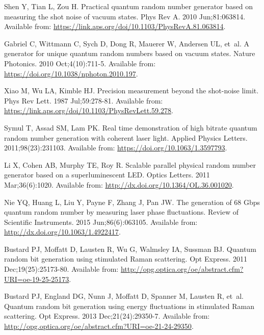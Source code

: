\documentclass[]{interact}
\theoremstyle{plain}%
\theoremstyle{definition}
\theoremstyle{remark}
\begin{document}
\begin{thebibliography}{100}
Shen Y, Tian L, Zou H.
\newblock Practical quantum random number generator based on measuring the shot
  noise of vacuum states.
\newblock Phys Rev A. 2010 Jun;81:063814.
\newblock Available from:
  \url{https://link.aps.org/doi/10.1103/PhysRevA.81.063814}.

Gabriel C, Wittmann C, Sych D, Dong R, Mauerer W, Andersen UL, et~al.
\newblock A generator for unique quantum random numbers based on vacuum states.
\newblock Nature Photonics. 2010 Oct;4(10):711-5.
\newblock Available from: \url{https://doi.org/10.1038/nphoton.2010.197}.

Xiao M, Wu LA, Kimble HJ.
\newblock Precision measurement beyond the shot-noise limit.
\newblock Phys Rev Lett. 1987 Jul;59:278-81.
\newblock Available from:
  \url{https://link.aps.org/doi/10.1103/PhysRevLett.59.278}.

Symul T, Assad SM, Lam PK.
\newblock Real time demonstration of high bitrate quantum random number
  generation with coherent laser light.
\newblock Applied Physics Letters. 2011;98(23):231103.
\newblock Available from: \url{https://doi.org/10.1063/1.3597793}.

Li X, Cohen AB, Murphy TE, Roy R.
\newblock Scalable parallel physical random number generator based on a
  superluminescent LED.
\newblock Optics Letters. 2011 Mar;36(6):1020.
\newblock Available from: \url{http://dx.doi.org/10.1364/OL.36.001020}.

Nie YQ, Huang L, Liu Y, Payne F, Zhang J, Pan JW.
\newblock The generation of 68 Gbps quantum random number by measuring laser
  phase fluctuations.
\newblock Review of Scientific Instruments. 2015 Jun;86(6):063105.
\newblock Available from: \url{http://dx.doi.org/10.1063/1.4922417}.

Bustard PJ, Moffatt D, Lausten R, Wu G, Walmsley IA, Sussman BJ.
\newblock Quantum random bit generation using stimulated Raman scattering.
\newblock Opt Express. 2011 Dec;19(25):25173-80.
\newblock Available from:
  \url{http://opg.optica.org/oe/abstract.cfm?URI=oe-19-25-25173}.

Bustard PJ, England DG, Nunn J, Moffatt D, Spanner M, Lausten R, et~al.
\newblock Quantum random bit generation using energy fluctuations in stimulated
  Raman scattering.
\newblock Opt Express. 2013 Dec;21(24):29350-7.
\newblock Available from:
  \url{http://opg.optica.org/oe/abstract.cfm?URI=oe-21-24-29350}.


\end{thebibliography}
\end{document}
